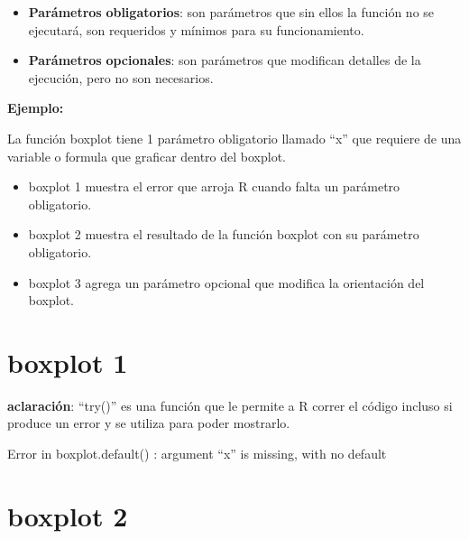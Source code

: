 \documentclass[
  letterpaper,
  DIV=11,
  numbers=noendperiod]{scrreprt}
\begin{document}
\begin{itemize}
\item
  \textbf{Parámetros} \textbf{obligatorios}: son parámetros que sin
  ellos la función no se ejecutará, son requeridos y mínimos para su
  funcionamiento.
\item
  \textbf{Parámetros} \textbf{opcionales}: son parámetros que modifican
  detalles de la ejecución, pero no son necesarios.
\end{itemize}

\textbf{Ejemplo:}

La función boxplot tiene 1 parámetro obligatorio llamado ``x'' que
requiere de una variable o formula que graficar dentro del boxplot.

\begin{tcolorbox}[enhanced jigsaw, opacityback=0, bottomrule=.15mm, rightrule=.15mm, leftrule=.75mm, coltitle=black, colbacktitle=quarto-callout-tip-color!10!white, left=2mm, title=\textcolor{quarto-callout-tip-color}{\faLightbulb}\hspace{0.5em}{Tip}, bottomtitle=1mm, toprule=.15mm, colframe=quarto-callout-tip-color-frame, breakable, titlerule=0mm, toptitle=1mm, arc=.35mm, colback=white, opacitybacktitle=0.6]

\begin{itemize}
\item
  boxplot 1 muestra el error que arroja R cuando falta un parámetro
  obligatorio.
\item
  boxplot 2 muestra el resultado de la función boxplot con su parámetro
  obligatorio.
\item
  boxplot 3 agrega un parámetro opcional que modifica la orientación del
  boxplot.
\end{itemize}

\end{tcolorbox}

\section{boxplot 1}

\textbf{aclaración}: ``try()'' es una función que le permite a R correr
el código incluso si produce un error y se utiliza para poder mostrarlo.

Error in boxplot.default() : argument ``x'' is missing, with no default

\section{boxplot 2}
\end{document}
